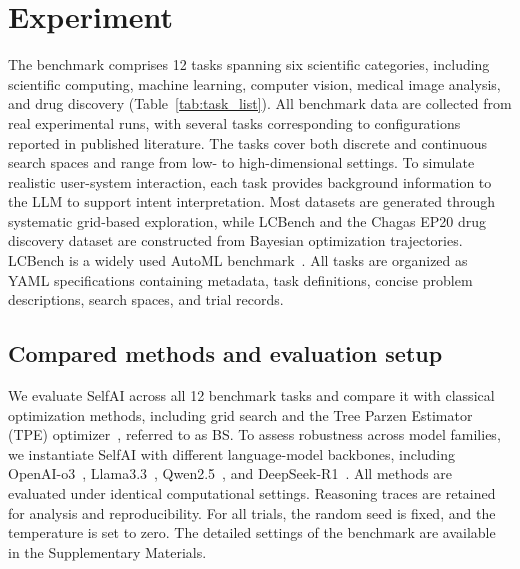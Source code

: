 \section{Experiment}

The benchmark comprises 12 tasks spanning six scientific categories, including scientific computing, machine learning, computer vision, medical image analysis, and drug discovery (Table~\ref{tab:task_list}). All benchmark data are collected from real experimental runs, with several tasks corresponding to configurations reported in published literature. The tasks cover both discrete and continuous search spaces and range from low- to high-dimensional settings. To simulate realistic user-system interaction, each task provides background information to the LLM to support intent interpretation. Most datasets are generated through systematic grid-based exploration, while LCBench and the Chagas EP20 drug discovery dataset are constructed from Bayesian optimization trajectories. LCBench is a widely used AutoML benchmark~\cite{zimmer2021auto}. All tasks are organized as YAML specifications containing metadata, task definitions, concise problem descriptions, search spaces, and trial records.
\subsection{Compared methods and evaluation setup}
We evaluate SelfAI across all 12 benchmark tasks and compare it with classical optimization methods, including grid search and the Tree Parzen Estimator (TPE) optimizer~\cite{optuna}, referred to as BS. To assess robustness across model families, we instantiate SelfAI with different language-model backbones, including OpenAI-o3~\cite{openai2023gpt}, Llama3.3~\cite{llama}, Qwen2.5~\cite{bai2023qwen}, and DeepSeek-R1~\cite{guo2025deepseek}. All methods are evaluated under identical computational settings. Reasoning traces are retained for analysis and reproducibility. For all trials, the random seed is fixed, and the temperature is set to zero. The detailed settings of the benchmark are available in the Supplementary Materials.

